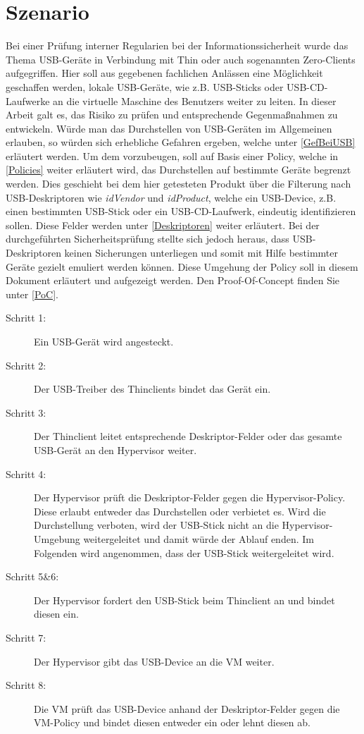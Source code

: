 \chapter{Szenario}
Bei einer Prüfung interner Regularien bei der Informationssicherheit wurde das Thema USB-Geräte in Verbindung mit Thin oder auch sogenannten Zero-Clients aufgegriffen. Hier soll aus gegebenen fachlichen Anlässen eine Möglichkeit geschaffen werden, lokale USB-Geräte, wie z.B. USB-Sticks oder USB-CD-Laufwerke an die virtuelle Maschine des Benutzers weiter zu leiten. In dieser Arbeit galt es, das Risiko zu prüfen und entsprechende Gegenmaßnahmen zu entwickeln.
Würde man das Durchstellen von USB-Geräten im Allgemeinen erlauben, so würden sich erhebliche Gefahren ergeben, welche unter \ref{GefBeiUSB} erläutert werden. Um dem vorzubeugen, soll auf Basis einer Policy, welche in \ref{Policies} weiter erläutert wird, das Durchstellen auf bestimmte Geräte begrenzt werden. Dies geschieht bei dem hier getesteten Produkt über die Filterung nach USB-Deskriptoren wie \textit{idVendor} und \textit{idProduct}, welche ein USB-Device, z.B. einen bestimmten USB-Stick oder ein USB-CD-Laufwerk, eindeutig identifizieren sollen. Diese Felder werden unter \ref{Deskriptoren} weiter erläutert.
Bei der durchgeführten Sicherheitsprüfung stellte sich jedoch heraus, dass USB-Deskriptoren keinen Sicherungen unterliegen und somit mit Hilfe bestimmter Geräte gezielt emuliert werden können. Diese Umgehung der Policy soll in diesem Dokument erläutert und aufgezeigt werden. Den Proof-Of-Concept finden Sie unter \ref{PoC}.



\begin{description}
	\item[Schritt 1: ] Ein USB-Gerät wird angesteckt.
	\item[Schritt 2: ] Der USB-Treiber des Thinclients bindet das Gerät ein.
	\item[Schritt 3: ] Der Thinclient leitet entsprechende Deskriptor-Felder oder das gesamte USB-Gerät an den Hypervisor weiter. 
	\item[Schritt 4: ] Der Hypervisor prüft die Deskriptor-Felder gegen die Hypervisor-Policy. Diese erlaubt entweder das Durchstellen oder verbietet es. Wird die Durchstellung verboten, wird der USB-Stick nicht an die Hypervisor-Umgebung weitergeleitet und damit würde der Ablauf enden. Im Folgenden wird angenommen, dass der USB-Stick weitergeleitet wird.
	\item[Schritt 5\&6: ] Der Hypervisor fordert den USB-Stick beim Thinclient an und bindet diesen ein.
	\item[Schritt 7: ] Der Hypervisor gibt das USB-Device an die VM weiter.
	\item[Schritt 8: ] Die VM prüft das USB-Device anhand der Deskriptor-Felder gegen die VM-Policy und bindet diesen entweder ein oder lehnt diesen ab.
\end{description}